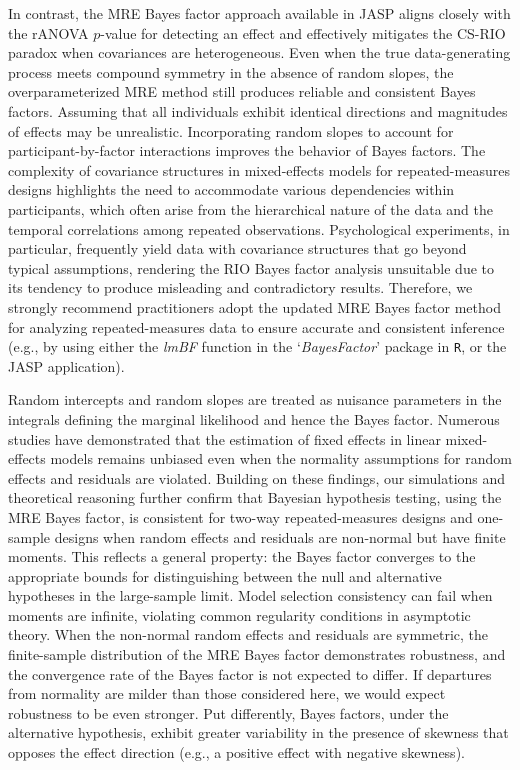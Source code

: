 \documentclass[preprint,12pt,authoryear]{elsarticle}
\begin{document}
In contrast, the MRE Bayes factor approach available in JASP aligns closely with the rANOVA $p$-value for detecting an effect and effectively mitigates the CS-RIO paradox when covariances are heterogeneous. Even when the true data-generating process meets compound symmetry in the absence of random slopes, the overparameterized MRE method still produces reliable and consistent Bayes factors. Assuming that all individuals exhibit identical directions and magnitudes of effects may be unrealistic. Incorporating random slopes to account for participant-by-factor interactions improves the behavior of Bayes factors. The complexity of covariance structures in mixed-effects models for repeated-measures designs highlights the need to accommodate various dependencies within participants, which often arise from the hierarchical nature of the data and the temporal correlations among repeated observations. Psychological experiments, in particular, frequently yield data with covariance structures that go beyond typical assumptions, rendering the RIO Bayes factor analysis unsuitable due to its tendency to produce misleading and contradictory results. Therefore, we strongly recommend practitioners adopt the updated MRE Bayes factor method for analyzing repeated-measures data to ensure accurate and consistent inference (e.g., by using either the \textit{lmBF} function in the `\textit{BayesFactor}' package in \texttt{R}, or the JASP application).

Random intercepts and random slopes are treated as nuisance parameters in the integrals defining the marginal likelihood and hence the Bayes factor. Numerous studies have demonstrated that the estimation of fixed effects in linear mixed-effects models remains unbiased even when the normality assumptions for random effects and residuals are violated. Building on these findings, our simulations and theoretical reasoning further confirm that Bayesian hypothesis testing, using the MRE Bayes factor, is consistent for two-way repeated-measures designs and one-sample designs when random effects and residuals are non-normal but have finite moments. This reflects a general property: the Bayes factor converges to the appropriate bounds for distinguishing between the null and alternative hypotheses in the large-sample limit. Model selection consistency can fail when moments are infinite, violating common regularity conditions in asymptotic theory. When the non-normal random effects and residuals are symmetric, the finite-sample distribution of the MRE Bayes factor demonstrates robustness, and the convergence rate of the Bayes factor is not expected to differ. If departures from normality are milder than those considered here, we would expect robustness to be even stronger. Put differently, Bayes factors, under the alternative hypothesis, exhibit greater variability in the presence of skewness that opposes the effect direction (e.g., a positive effect with negative skewness).
\end{document}
